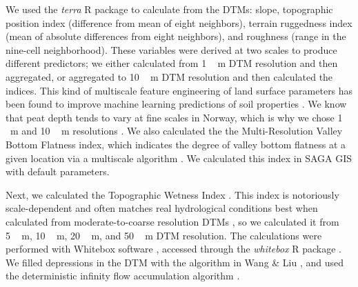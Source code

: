 \documentclass[soil, manuscript]{copernicus}
\begin{document}
We used the \emph{terra} R package to calculate from the DTMs: slope, topographic position index (difference from mean of eight neighbors), terrain ruggedness index (mean of absolute differences from eight neighbors), and roughness (range in the nine-cell neighborhood).
These variables were derived at two scales to produce different predictors; we either calculated from \unit{1\,m} DTM resolution and then aggregated, or aggregated to \unit{10\,m} DTM resolution and then calculated the indices.
This kind of multiscale feature engineering of land surface parameters has been found to improve machine learning predictions of soil properties \citep{millerImpactMultiscalePredictor2015, dornikOptimalScalingPredictors2022, newmanAssessingSpatiallyHeterogeneous2023}.
We know that peat depth tends to vary at fine scales in Norway, which is why we chose \unit{1\,m} and \unit{10\,m} resolutions \citep{maxwellLandsurfaceParametersSpatial2022}.
We also calculated the the Multi-Resolution Valley Bottom Flatness index, which indicates the degree of valley bottom flatness at a given location via a multiscale algorithm \citep{gallantMultiresolutionIndexValley2003}.
We calculated this index in SAGA GIS \citep[v.9.3.2,][]{conradSystemAutomatedGeoscientific2015} with default parameters.

Next, we calculated the Topographic Wetness Index \citep{quinnPredictionHillslopeFlow1991}.
This index is notoriously scale-dependent and often matches real hydrological conditions best when calculated from moderate-to-coarse resolution DTMs \citep{agrenEvaluatingDigitalTerrain2014, riihimakiTopographicWetnessIndex2021}, so we calculated it from \unit{5\,m}, \unit{10\,m}, \unit{20\,m}, and \unit{50\,m} DTM resolution.
The calculations were performed with Whitebox software \citep{lindsayWhiteboxGATCase2016}, accessed through the \emph{whitebox} R package \citep[v2.4,][]{wuWhiteboxWhiteboxToolsFrontend2022}.
We filled depressions in the DTM with the algorithm in Wang \& Liu \citeyearpar{wangEfficientMethodIdentifying2006}, and used the deterministic infinity flow accumulation algorithm \citep{tarbotonNewMethodDetermination1997}.
\end{document}
